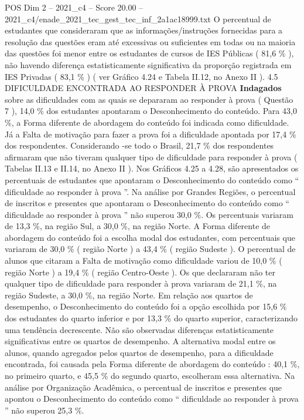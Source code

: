 \begin{textsample}{POS Dim 2 – 2021\_c4 – Score 20.00 – 2021\_c4/enade\_2021\_tec\_gest\_tec\_inf\_2a1ac18999.txt}
O percentual de estudantes que consideraram que as informações/instruções fornecidas para a resolução das questões eram até excessivas ou suficientes em todas ou na maioria das questões foi menor entre os estudantes de cursos de IES Públicas ( 81,6 \% ), não havendo diferença estatisticamente significativa da proporção registrada em IES Privadas ( 83,1 \% ) ( ver Gráfico 4.24 e Tabela II.12, no Anexo II ). 4.5 DIFICULDADE ENCONTRADA AO RESPONDER À PROVA \textbf{Indagados} sobre as dificuldades com as quais se depararam ao responder à prova ( Questão 7 ), 14,0 \% dos estudantes apontaram o Desconhecimento do conteúdo.
Para 43,0 \%, a Forma diferente de abordagem do conteúdo foi indicada como dificuldade.
Já a Falta de motivação para fazer a prova foi a dificuldade apontada por 17,4 \% dos respondentes.
Considerando -se todo o Brasil, 21,7 \% dos respondentes afirmaram que não tiveram qualquer tipo de dificuldade para responder à prova ( Tabelas II.13 e II.14, no Anexo II ).
Nos Gráficos 4.25 a 4.28, são apresentados os percentuais de estudantes que apontaram o Desconhecimento do conteúdo como “ dificuldade ao responder à prova ”.
Na análise por Grandes Regiões, o percentual de inscritos e presentes que apontaram o Desconhecimento do conteúdo como “ dificuldade ao responder à prova ” não superou 30,0 \%.
Os percentuais variaram de 13,3 \%, na região Sul, a 30,0 \%, na região Norte.
A Forma diferente de abordagem do conteúdo foi a escolha modal dos estudantes, com percentuais que variaram de 30,0 \% ( região Norte ) a 43,4 \% ( região Sudeste ).
O percentual de alunos que citaram a Falta de motivação como dificuldade variou de 10,0 \% ( região Norte ) a 19,4 \% ( região Centro-Oeste ).
Os que declararam não ter qualquer tipo de dificuldade para responder à prova variaram de 21,1 \%, na região Sudeste, a 30,0 \%, na região Norte.
Em relação aos quartos de desempenho, o Desconhecimento do conteúdo foi a opção escolhida por 15,6 \% dos estudantes do quarto inferior e por 13,3 \% do quarto superior, caracterizando uma tendência decrescente.
Não são observadas diferenças estatisticamente significativas entre os quartos de desempenho.
A alternativa modal entre os alunos, quando agregados pelos quartos de desempenho, para a dificuldade encontrada, foi causada pela Forma diferente de abordagem do conteúdo : 40,1 \%, no primeiro quarto, e 45,5 \% do segundo quarto, escolheram essa alternativa.
Na análise por Organização Acadêmica, o percentual de inscritos e presentes que apontou o Desconhecimento do conteúdo como “ dificuldade ao responder à prova ” não superou 25,3 \%.

\end{textsample}
